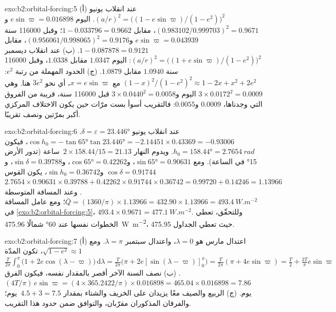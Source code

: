 \begin{solution}{exo:b2:orbital-forcing:5}
(أ) عند انقلاب يونيو $(a/r)^2 = \bigl((1 - e\sin\varpi)/(1 - e^2)\bigr)^2$. اليوم $e\sin\varpi
= 0.016898$ و$(0.983102/0.999703)^2 = 0.9671$، مقابل $1 - 0.033796 = 0.9662$؛
وقبل \num{116000} سنة $e\sin\varpi = 0.043939$ و$(0.956061/0.998065)^2 = 0.9176$، مقابل $1 -
0.087878 = 0.9121$. (ب) عند انقلاب ديسمبر $(a/r)^2 = \bigl((1 + e\sin\varpi)/(1 -
e^2)\bigr)^2$: اليوم $1.0347$ مقابل $1.0338$، وقبل \num{116000} سنة $1.0940$ مقابل $1.0879$.
(ج) الحدود المهملة من رتبة $e^2$: $(1 - x)^2/(1 - e^2)^2 \approx 1 - 2x + x^2 + 2e^2$
مع $x = e\sin\varpi$، أي نحو $3e^2$ هنا. وهي $3 \times 0.0172^2 = 0.0009$ اليوم و$3
\times 0.0440^2 = 0.0058$ قبل \num{116000} سنة، قريبة من الفروق التي وجدناها، $0.0009$
و$0.0055$: فالتقريب أسوأ بست مرّات حين يكون الاختلاف المركزي أكبر بمرّتين ونصف
تقريبًا.
\end{solution}

\begin{solution}{exo:b2:orbital-forcing:6}
عند انقلاب يونيو $\delta = \varepsilon = \ang{23.446}$. $\cos h_0 = -\tan\ang{65}\tan\ang{23.446}
= -2.14451 \times 0.43369 = -0.93006$، فيكون $h_0 = \ang{158.44} = \qty{2.7654}{rad}$. ويدوم النهار
$2 \times 158.44/15 = 21.13$~ساعة (تدور الأرض \ang{15} في الساعة). ومع $\sin\ang{65} = 0.90631$،
و$\cos\ang{65} = 0.42262$، و$\sin\delta = 0.39788$، و$\cos\delta = 0.91744$ و$\sin h_0 = 0.36742$،
يكون القوس $2.7654 \times 0.90631 \times 0.39788 + 0.42262 \times 0.91744 \times 0.36742 = 0.99720
+ 0.14246 = 1.13966$. وعند المسافة المتوسطة $\bar Q = (1360/\pi) \times 1.13966 = 432.90 \times 1.13966
= \qty{493.4}{W.m^{-2}}$؛ ومع عامل المسافة في \cref{exo:b2:orbital-forcing:5}، $493.4 \times
0.9671 = \qty{477.1}{W.m^{-2}}$. وللتحقّق، تعطي الخطوات نفسها عند \ang{60} شمالًا \qty{475.96}{W.m^{-2}}، حيث تعطي الجداول \num{475.95}.
\end{solution}

\begin{solution}{exo:b2:orbital-forcing:7}
(أ) اعتدال مارس هو $\lambda = 0$، واعتدال سبتمبر $\lambda = \pi$. ومع $\sqrt{1 - e^2}
\approx 1$، تكون المدّة $\frac{T}{2\pi}\int_0^{\pi}\bigl(1 + 2e\cos(\lambda -
\varpi)\bigr)\,\mathrm d\lambda = \frac{T}{2\pi}\bigl(\pi + 2e[\sin(\lambda - \varpi)]_0^{\pi}\bigr)
= \frac{T}{2\pi}(\pi + 4e\sin\varpi) = \frac T2 + \frac{2T}{\pi}e\sin\varpi$. (ب) نصف السنة الآخر
أقصر بالمقدار نفسه، فيكون الفرق $(4T/\pi)\,e\sin\varpi = (4 \times
365.2422/\pi) \times 0.016898 = 465.04 \times 0.016898 = 7.86$~يوم. (ج) الربيع والصيف معًا
يزيدان على الخريف والشتاء بمقدار $4.5 + 3 = 7.5$~يوم؛ والفرقان المذكوران مقرّبان،
والتوافق ضمن حدود هذا التقريب.
\end{solution}


